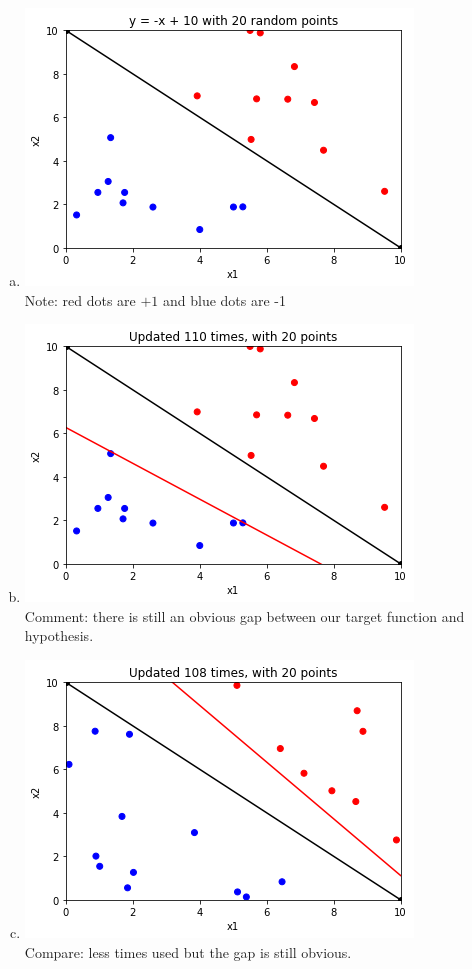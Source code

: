 \documentclass{article}
\def\math#1{$#1$}
\begin{document}
\begin{enumerate}[a)]
    \item \includegraphics{1.4/1} \\ Note: red dots are \math{+1} and blue dots are -1
    \item \includegraphics{1.4/2} \\ Comment: there is still an obvious gap between our target function and hypothesis.
    \item \includegraphics{1.4/3} \\ Compare: less times used but the gap is still obvious.

\end{enumerate}
\end{document}
